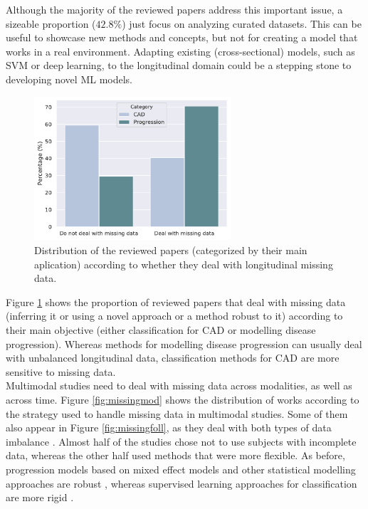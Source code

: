 Although the majority of the reviewed papers address this important issue, a sizeable proportion ($42.8 \%$) just focus on analyzing curated datasets. This can be useful to showcase new methods and concepts, but not for creating a model that works in a real environment. Adapting existing (cross-sectional) models, such as SVM or deep learning, to the longitudinal domain \cite{Adhikari2019,Ghazi2019,Jie2017,Zhu2016a} could be a stepping stone to developing novel ML models. \\

\begin{figure}[!htbp]
\centering
\includegraphics[width=0.65\textwidth]{figures/review/Fig8.pdf}
    \caption[Distribution of the reviewed papers according to whether they deal with longitudinal missing data.]{Distribution of the reviewed papers (categorized by their main aplication) according to whether they deal with longitudinal missing data.}
    \label{fig:missingcat}
\end{figure}

Figure \ref{fig:missingcat} shows the proportion of reviewed papers that deal with missing data (inferring it or using a novel approach or a method robust to it) according to their main objective (either classification for CAD or modelling disease progression). Whereas methods for modelling disease progression can usually deal with unbalanced longitudinal data, classification methods for CAD are more sensitive to missing data.  \\

Multimodal studies need to deal with missing data across modalities, as well as across time. Figure \ref{fig:missingmod} shows the distribution of works according to the strategy used to handle missing data in multimodal studies. Some of them also appear in Figure \ref{fig:missingfoll}, as they deal with both types of data imbalance \cite{Adhikari2019,Goyal2018,Iturria-Medina2016,Jedynak2012}. Almost half of the studies chose not to use subjects with incomplete data, whereas the other half used methods that were more flexible. As before, progression models based on mixed effect models and other statistical modelling approaches are robust \cite{Iturria-Medina2016,Jedynak2012,Schmidt-Richberg2015,Villemagne2013}, whereas supervised learning approaches for classification are more rigid \cite{Vounou2012,Young2014,Zhang2012a}. \\

